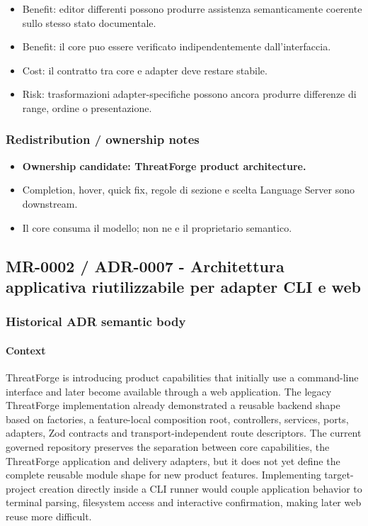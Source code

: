\documentclass[
  10pt,
]{article}
\providecommand{\tightlist}{%
  \setlength{\itemsep}{0pt}\setlength{\parskip}{0pt}}
\begin{document}
\begin{itemize}
\tightlist
\item
  Benefit: editor differenti possono produrre assistenza semanticamente
  coerente sullo stesso stato documentale.
\item
  Benefit: il core puo essere verificato indipendentemente
  dall'interfaccia.
\item
  Cost: il contratto tra core e adapter deve restare stabile.
\item
  Risk: trasformazioni adapter-specifiche possono ancora produrre
  differenze di range, ordine o presentazione.
\end{itemize}

\subsubsection{Redistribution / ownership
notes}\label{redistribution-ownership-notes-14}

\begin{itemize}
\tightlist
\item
  \textbf{Ownership candidate: ThreatForge product architecture.}
\item
  Completion, hover, quick fix, regole di sezione e scelta Language
  Server sono downstream.
\item
  Il core consuma il modello; non ne e il proprietario semantico.
\end{itemize}

\subsection{MR-0002 / ADR-0007 - Architettura applicativa riutilizzabile
per adapter CLI e
web}\label{mr-0002-adr-0007---architettura-applicativa-riutilizzabile-per-adapter-cli-e-web}

\subsubsection{Historical ADR semantic
body}\label{historical-adr-semantic-body-15}

\paragraph{Context}\label{context-30}

ThreatForge is introducing product capabilities that initially use a
command-line interface and later become available through a web
application. The legacy ThreatForge implementation already demonstrated
a reusable backend shape based on factories, a feature-local composition
root, controllers, services, ports, adapters, Zod contracts and
transport-independent route descriptors. The current governed repository
preserves the separation between core capabilities, the ThreatForge
application and delivery adapters, but it does not yet define the
complete reusable module shape for new product features. Implementing
target-project creation directly inside a CLI runner would couple
application behavior to terminal parsing, filesystem access and
interactive confirmation, making later web reuse more difficult.
\end{document}

